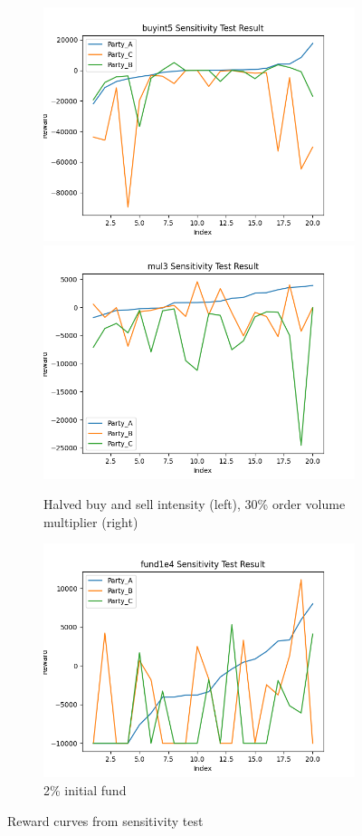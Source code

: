 \documentclass[11pt,twoside]{article}
\numberwithin{Theorem}{section}
\numberwithin{Definition}{section}
\numberwithin{Lemma}{section}
\numberwithin{Algorithm}{section}
\numberwithin{equation}{section}
\begin{document}
\begin{figure}[ht]
\begin{subfigure}{0.95\textwidth}
    \includegraphics[width=0.48\linewidth]{images/ST_buyint5.png}
    \includegraphics[width=0.48\linewidth]{images/ST_mul3.png}
    \caption{Halved buy and sell intensity (left), 30\% order volume multiplier (right)}
    \label{fig:BSI&Mul}
\end{subfigure}

\begin{subfigure}{0.45\textwidth}
    \includegraphics[width=\linewidth]{images/ST_fund1e4.png}
    \caption{2\% initial fund}
    \label{fig:Fund}
\end{subfigure}

\caption{Reward curves from sensitivity test}
\label{fig:ST}
\end{figure}
\end{document}
